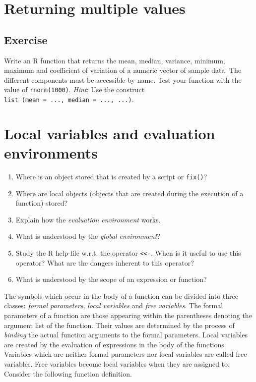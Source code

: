 \documentclass[
]{book}
\begin{document}
\section{Returning multiple values}\label{returning-multiple-values}

\subsection{Exercise}\label{exercise-11}

Write an R function that returns the mean, median, variance, minimum, maximum and coefficient of variation of a numeric vector of sample data. The different components must be accessible by name. Test your function with the value of \texttt{rnorm(1000)}. \emph{Hint}: Use the construct \texttt{list\ (mean\ =\ ...,\ median\ =\ ...,\ ...)}.

\section{Local variables and evaluation environments}\label{local-variables-and-evaluation-environments}

\begin{enumerate}
\def\labelenumi{(\alph{enumi})}
\item
  Where is an object stored that is created by a script or \texttt{fix()}?
\item
  Where are local objects (objects that are created during the execution of a function) stored?
\item
  Explain how the \emph{{evaluation environment}} works.
\item
  What is understood by the \emph{{global environment}}?
\item
  Study the R help-file w.r.t. the operator \texttt{\textless{}\textless{}-}. When is it useful to use this operator? What are the dangers inherent to this operator?
\item
  What is understood by the scope of an expression or function?
\end{enumerate}

The symbols which occur in the body of a function can be divided into three classes: \emph{{formal parameters}}, \emph{{local variables}} and \emph{{free variables}}. The formal parameters of a function are those appearing within the parentheses denoting the argument list of the function. Their values are determined by the process of \emph{{binding}} the actual function arguments to the formal parameters. Local variables are created by the evaluation of expressions in the body of the functions. Variables which are neither formal parameters nor local variables are called free variables. Free variables become local variables when they are assigned to. Consider the following function definition.
\end{document}
